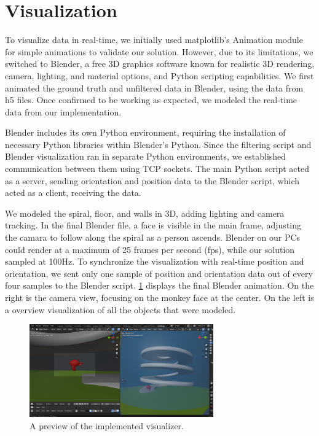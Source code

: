\par

\section{Visualization}

To visualize data in real-time, we initially used matplotlib's Animation module for simple animations to validate our solution. However, due to its limitations, we switched to Blender, a free 3D graphics software known for realistic 3D rendering, camera, lighting, and material options, and Python scripting capabilities. 
We first animated the ground truth and unfiltered data in Blender, using the data from h5 files. Once confirmed to be working as expected, we modeled the real-time data from our implementation.
\par
Blender includes its own Python environment, requiring the installation of necessary Python libraries within Blender's Python. Since the filtering script and Blender visualization ran in separate Python environments, we established communication between them using TCP sockets. The main Python script acted as a server, sending orientation and position data to the Blender script, which acted as a client, receiving the data.
\par
We modeled the spiral, floor, and walls in 3D, adding lighting and camera tracking. In the final Blender file, a face is visible in the main frame, adjusting the camara to follow along the spiral as a person ascends.
Blender on our PCs could render at a maximum of 25 frames per second (fps), while our solution sampled at 100Hz. To synchronize the visualization with real-time position and orientation, we sent only one sample of position and orientation data out of every four samples to the Blender script.
\cref{viz} displays the final Blender animation. On the right is the camera view, focusing on the monkey face at the center. On the left is a overview visualization of all the objects that were modeled.

\begin{figure}[h] 
	\centering \includegraphics[height=4cm]{./images/visualization.png}
	\caption{A preview of the implemented visualizer.}
	\label{viz}
\end{figure}

